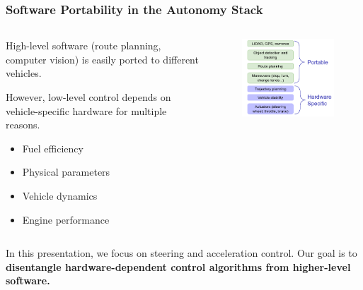 \documentclass{beamer}
\begin{document}
\begin{frame}
\frametitle{Software Portability in the Autonomy Stack}

\begin{columns}
	\begin{column}{0.5\linewidth}
High-level software (route planning, computer vision) is easily ported to different vehicles.
		
		However, low-level control depends on vehicle-specific hardware for multiple reasons.
		\begin{itemize}
			\item Fuel efficiency
			\item Physical parameters
			\item Vehicle dynamics
			\item Engine performance
		\end{itemize}
		\end{column}
	\begin{column}{0.45\linewidth}
		\begin{figure}
			\includegraphics[width=1.0\linewidth]{figures/autonomy_stack_small.png}
		\end{figure}
	\end{column}
\end{columns}
\vspace{1.0em}

In this presentation, we focus on steering and acceleration control. Our goal is to \textbf{disentangle hardware-dependent control algorithms from higher-level software.}
\end{frame}
\end{document}

